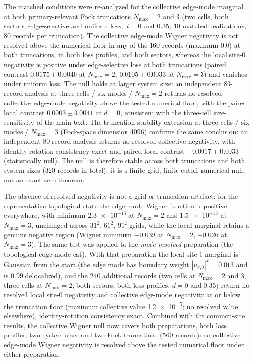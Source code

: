 \documentclass[aps,pra,preprint,superscriptaddress,amsmath,amssymb]{revtex4-2}
\begin{document}
The matched conditions were re-analyzed for the collective edge-mode marginal at both primary-relevant Fock truncations $N_{\max}=\num{2}$ and \num{3} (two cells, both sectors, edge-selective and uniform loss, $d=\num{0}$ and \num{0.35}, \num{10} matched realizations, \num{80} records per truncation). The collective edge-mode Wigner negativity is not resolved above the numerical floor in any of the \num{160} records (maximum \num{0.0}) at both truncations, in both loss profiles, and both sectors, whereas the local site-0 negativity is positive under edge-selective loss at both truncations (paired contrast $\num{+0.0175}\pm\num{0.0040}$ at $N_{\max}=\num{2}$; $\num{+0.0105}\pm\num{0.0033}$ at $N_{\max}=\num{3}$) and vanishes under uniform loss. The null holds at larger system size: an independent \num{80}-record analysis at three cells / six modes / $N_{\max}=\num{2}$ returns no resolved collective edge-mode negativity above the tested numerical floor, with the paired local contrast $\num{+0.0003}\pm\num{0.0041}$ at $d=\num{0}$, consistent with the three-cell size-sensitivity of the main text. The truncation-stability extension at three cells / six modes / $N_{\max}=\num{3}$ (Fock-space dimension \num{4096}) confirms the same conclusion: an independent \num{80}-record analysis returns no resolved collective negativity, with identity-rotation consistency exact and paired local contrast $\num{-0.0017}\pm\num{0.0033}$ (statistically null). The null is therefore stable across both truncations and both system sizes (\num{320} records in total); it is a finite-grid, finite-cutoff numerical null, not an exact-zero theorem.

The absence of resolved negativity is not a grid or truncation artefact: for the representative topological state the edge-mode Wigner function is positive everywhere, with minimum $\num{+2.3e-13}$ at $N_{\max}=\num{2}$ and $\num{+1.5e-13}$ at $N_{\max}=\num{3}$, unchanged across $\num{31}^2$, $\num{61}^2$, $\num{91}^2$ grids, while the local marginal retains a genuine negative region (Wigner minimum $\num{-0.039}$ at $N_{\max}=\num{2}$, $\num{-0.026}$ at $N_{\max}=\num{3}$). The same test was applied to the \emph{mode-resolved} preparation (the topological edge-mode cat). With that preparation the local site-0 marginal is Gaussian from the start (the edge mode has boundary weight $|u_{e,0}|^2=\num{0.013}$ and is \num{0.99} delocalized), and the \num{240} additional records (two cells at $N_{\max}=\num{2}$ and \num{3}, three cells at $N_{\max}=\num{2}$; both sectors, both loss profiles, $d=\num{0}$ and \num{0.35}) return no resolved local site-0 negativity and collective edge-mode negativity at or below the truncation floor (maximum collective value \num{1.2e-5}; no resolved value elsewhere), identity-rotation consistency exact. Combined with the common-site results, the collective Wigner null now covers both preparations, both loss profiles, two system sizes and two Fock truncations (\num{560} records): no collective edge-mode Wigner negativity is resolved above the tested numerical floor under either preparation.
\end{document}
